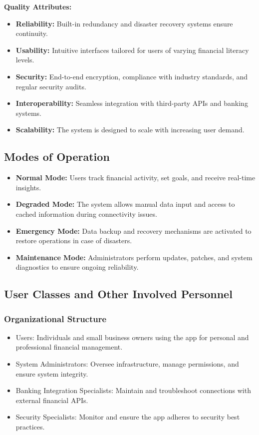 \textbf{Quality Attributes:}
\begin{itemize}
    \item \textbf{Reliability:} Built-in redundancy and disaster recovery systems ensure continuity.
    \item \textbf{Usability:} Intuitive interfaces tailored for users of varying financial literacy levels.
    \item \textbf{Security:} End-to-end encryption, compliance with industry standards, and regular security audits.
    \item \textbf{Interoperability:} Seamless integration with third-party APIs and banking systems.
    \item \textbf{Scalability:} The system is designed to scale with increasing user demand.
\end{itemize}

\subsection{Modes of Operation}
\begin{itemize}
    \item \textbf{Normal Mode:} Users track financial activity, set goals, and receive real-time insights.
    \item \textbf{Degraded Mode:} The system allows manual data input and access to cached information during connectivity issues.
    \item \textbf{Emergency Mode:} Data backup and recovery mechanisms are activated to restore operations in case of disasters.
    \item \textbf{Maintenance Mode:} Administrators perform updates, patches, and system diagnostics to ensure ongoing reliability.
\end{itemize}

\subsection{User Classes and Other Involved Personnel}

\subsubsection{Organizational Structure}
\begin{itemize}
    \item Users: Individuals and small business owners using the app for personal and professional financial management.
    \item System Administrators: Oversee infrastructure, manage permissions, and ensure system integrity.
    \item Banking Integration Specialists: Maintain and troubleshoot connections with external financial APIs.
    \item Security Specialists: Monitor and ensure the app adheres to security best practices.
\end{itemize}

